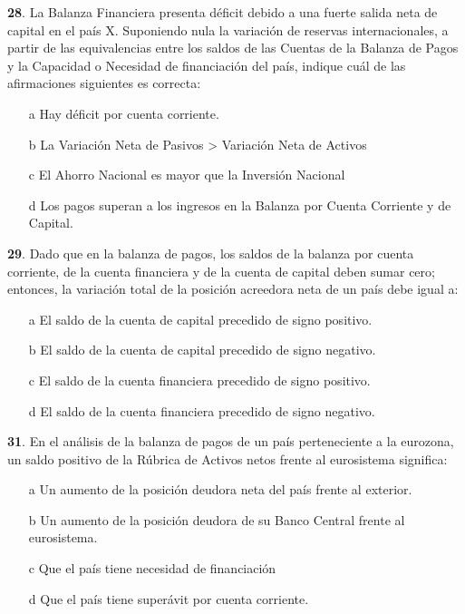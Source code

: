 \documentclass{nuevotema}
\begin{document}

\textbf{28}. La Balanza Financiera presenta déficit debido a una fuerte salida neta de capital en el país X. Suponiendo nula la variación de reservas internacionales, a partir de las equivalencias entre los saldos de las Cuentas de la Balanza de Pagos y la Capacidad o Necesidad de financiación del país, indique cuál de las afirmaciones siguientes es correcta:

\begin{enumerate}
	\item[a] Hay déficit por cuenta corriente.
	\item[b] La Variación Neta de Pasivos > Variación Neta de Activos
	\item[c] El Ahorro Nacional es mayor que la Inversión Nacional
	\item[d] Los pagos superan a los ingresos en la Balanza por Cuenta Corriente y de Capital.
\end{enumerate}


\textbf{29}. Dado que en la balanza de pagos, los saldos de la balanza por cuenta corriente, de la cuenta financiera y de la cuenta de capital deben sumar cero; entonces, la variación total de la posición acreedora neta de un país debe igual a:

\begin{enumerate}
    \item[a] El saldo de la cuenta de capital precedido de signo positivo.
    \item[b] El saldo de la cuenta de capital precedido de signo negativo.
    \item[c] El saldo de la cuenta financiera precedido de signo positivo.
    \item[d] El saldo de la cuenta financiera precedido de signo negativo.
\end{enumerate}

\textbf{31}. En el análisis de la balanza de pagos de un país perteneciente a la eurozona, un saldo positivo de la Rúbrica de Activos netos frente al eurosistema significa:

\begin{enumerate}
    \item[a] Un aumento de la posición deudora neta del país frente al exterior.
    \item[b] Un aumento de la posición deudora de su Banco Central frente al eurosistema.
    \item[c] Que el país tiene necesidad de financiación
    \item[d] Que el país tiene superávit por cuenta corriente.
\end{enumerate}
\end{document}
